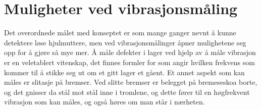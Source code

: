 \section {Muligheter ved vibrasjonsmåling}
Det overordnede målet med konseptet er som mange ganger nevnt 
å kunne detektere løse hjulmuttere, men ved vibrasjonsmålinger åpner mulighetene seg 
opp for å gjøre så mye mer. Å måle defekter i lager ved hjelp av å måle vibrasjon er en 
veletablert vitenskap, det finnes formler for som angir hvilken frekvens som kommer til 
å stikke seg ut om et gitt lager et gåent. Et annet aspekt som kan måles er slitasje på bremser. 
Ved slitte bremser er belegget på bremeseskoa borte, og det gnisser da stål mot stål inne i tromlene, 
og dette fører til en høgfrekvent vibrasjon som kan måles, og også høres om man står i nærheten. 